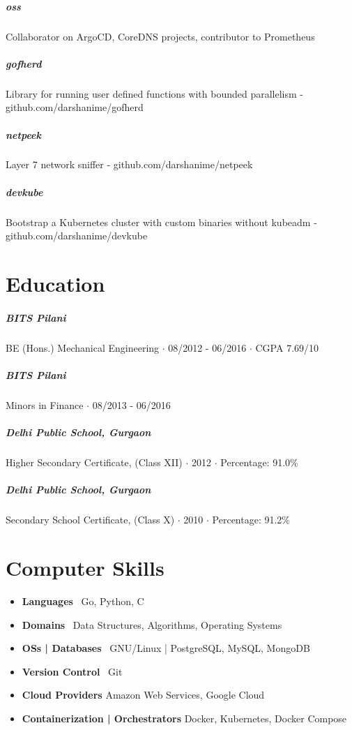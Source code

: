 \documentclass[10pt,letterpaper]{article}
\begin{document}
\subparagraph{oss}
Collaborator on ArgoCD, CoreDNS projects, contributor to Prometheus

\subparagraph{gofherd}
Library for running user defined functions with bounded parallelism - github.com/darshanime/gofherd

\subparagraph{netpeek}
Layer 7 network sniffer - github.com/darshanime/netpeek

\subparagraph{devkube}
Bootstrap a Kubernetes cluster with custom binaries without kubeadm - github.com/darshanime/devkube

\section*{Education}

\subparagraph{BITS Pilani}
 BE (Hons.) Mechanical Engineering $\cdot$ 08/2012 - 06/2016 $\cdot$ CGPA 7.69/10

\subparagraph{BITS Pilani}
Minors in Finance $\cdot$ 08/2013 - 06/2016

\subparagraph{Delhi Public School, Gurgaon}
Higher Secondary Certificate, (Class XII) $\cdot$ 2012 $\cdot$ Percentage: 91.0\%

\subparagraph{Delhi Public School, Gurgaon}
Secondary School Certificate, (Class X) $\cdot$ 2010 $\cdot$ Percentage: 91.2\%

\section*{Computer Skills}

\begin{itemize}
    \item \textbf{Languages} \ Go, Python, C
    \item \textbf{Domains} \ Data Structures, Algorithms, Operating Systems
    \item \textbf{OSs | Databases} \ GNU/Linux | PostgreSQL, MySQL, MongoDB
    \item \textbf{Version Control} \ Git
    \item \textbf{Cloud Providers} Amazon Web Services, Google Cloud
    \item \textbf{Containerization | Orchestrators} Docker, Kubernetes, Docker Compose
\end{itemize}
\end{document}
